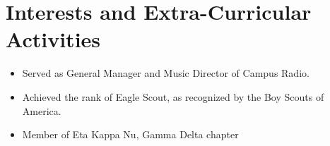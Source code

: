 \documentclass[11pt,a4paper,sans]{moderncv}        %
\begin{document}
\section{Interests and Extra-Curricular Activities}


\begin{itemize}

\item{Served as General Manager and Music Director of Campus Radio.}
\item{Achieved the rank of Eagle Scout, as recognized by the Boy Scouts of America.}
\item{Member of Eta Kappa Nu, Gamma Delta chapter}

\end{itemize}

%


\end{document}

